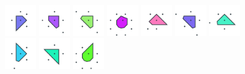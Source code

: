\documentclass[text.tex]{subfiles}
\begin{document}
\begin{figure}[h!]
\includegraphics[width=0.12\textwidth]{img/results/circle8/circle8_100000_(1_0alpha_1)_005.pdf}
\includegraphics[width=0.12\textwidth]{img/results/circle8/circle8_100000_(1_0alpha_1)_006.pdf}
\includegraphics[width=0.12\textwidth]{img/results/circle8/circle8_100000_(1_0alpha_1)_007.pdf}
\includegraphics[width=0.12\textwidth]{img/results/circle8/circle8_100000_(1_0alpha_1)_008.pdf}
\includegraphics[width=0.12\textwidth]{img/results/circle8/circle8_100000_(1_0alpha_1)_009.pdf}
\includegraphics[width=0.12\textwidth]{img/results/circle8/circle8_100000_(1_0alpha_1)_010.pdf}
\includegraphics[width=0.12\textwidth]{img/results/circle8/circle8_100000_(1_0alpha_1)_011.pdf}
\includegraphics[width=0.12\textwidth]{img/results/circle8/circle8_100000_(1_0alpha_1)_012.pdf}
\includegraphics[width=0.12\textwidth]{img/results/circle8/circle8_100000_(1_0alpha_1)_013.pdf}
\includegraphics[width=0.12\textwidth]{img/results/circle8/circle8_100000_(1_0alpha_1)_014.pdf}
\end{figure}
\end{document}
